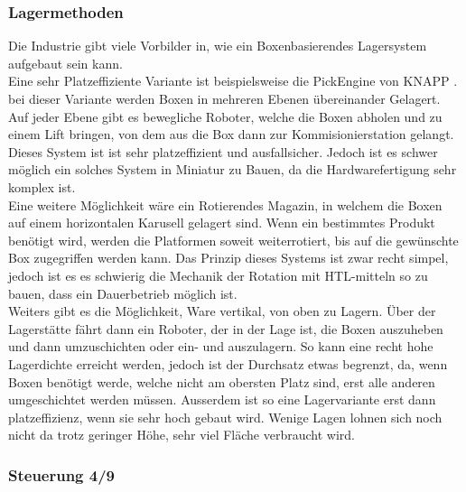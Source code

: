 \subsubsection{Lagermethoden}
Die Industrie gibt viele Vorbilder in, wie ein Boxenbasierendes Lagersystem aufgebaut sein kann. \\
Eine sehr Platzeffiziente Variante ist beispielsweise die PickEngine von KNAPP \cite{pickengine}. bei dieser Variante werden Boxen in mehreren Ebenen übereinander Gelagert. Auf jeder Ebene gibt es bewegliche Roboter, welche die Boxen abholen und zu einem Lift bringen, von dem aus die Box dann zur Kommisionierstation gelangt. Dieses System ist ist sehr platzeffizient und ausfallsicher. Jedoch ist es schwer möglich ein solches System in Miniatur zu Bauen, da die Hardwarefertigung sehr komplex ist.\\
Eine weitere Möglichkeit wäre ein Rotierendes Magazin, in welchem die Boxen auf einem horizontalen Karusell gelagert sind. Wenn ein bestimmtes Produkt benötigt wird, werden die Platformen soweit weiterrotiert, bis auf die gewünschte Box zugegriffen werden kann. Das Prinzip dieses Systems ist zwar recht simpel, jedoch ist es es schwierig die Mechanik der Rotation mit HTL-mitteln so zu bauen, dass ein Dauerbetrieb möglich ist. \\
Weiters gibt es die Möglichkeit, Ware vertikal, von oben zu Lagern. Über der Lagerstätte fährt dann ein Roboter, der in der Lage ist, die Boxen auszuheben und dann umzuschichten oder ein- und auszulagern. So kann eine recht hohe Lagerdichte erreicht werden, jedoch ist der Durchsatz etwas begrenzt, da, wenn Boxen benötigt werde, welche nicht am obersten Platz sind, erst alle anderen umgeschichtet werden müssen. Ausserdem ist so eine Lagervariante erst dann platzeffizienz, wenn sie sehr hoch gebaut wird. Wenige Lagen lohnen sich noch nicht da trotz geringer Höhe, sehr viel Fläche verbraucht wird.



\subsubsection{Steuerung 4/9}


